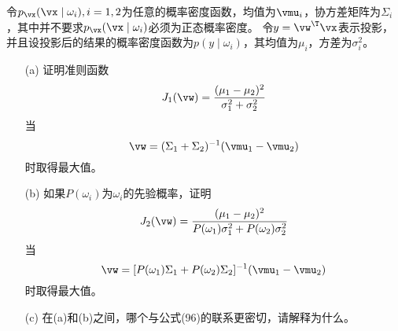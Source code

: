 \documentclass[reportComp]{thesis}
\begin{document}
\begin{question}[\textsection 3 Q38]
令$p_\vx(\vx\mid\omega_i),i=1,2$为任意的概率密度函数，均值为$\vmu_i$，协方差矩阵为$\Sigma_i$，其中并不要求$p_\vx(\vx\mid\omega_i)$必须为正态概率密度。
令$y=\vw^\T\vx$表示投影，并且设投影后的结果的概率密度函数为$p(y\mid\omega_i)$，其均值为$\mu_i$，方差为$\sigma^2_i$。
\begin{itemize}
	\item [(a)] 证明准则函数
	\[J_1(\vw)=\frac{(\mu_1-\mu_2)^2}{\sigma_1^2+\sigma_2^2}\]
	当
	\[\vw=(\Sigma_1+\Sigma_2)^{-1}(\vmu_1-\vmu_2)\]
	时取得最大值。
	\item [(b)] 如果$P(\omega_i)$为$\omega_i$的先验概率，证明
	\[J_2(\vw)=\frac{(\mu_1-\mu_2)^2}{P(\omega_1)\sigma_1^2+P(\omega_2)\sigma_2^2}\]
	当
	\[\vw=[P(\omega_1)\Sigma_1+P(\omega_2)\Sigma_2]^{-1}(\vmu_1-\vmu_2)\]
	时取得最大值。
	\item [(c)] 在(a)和(b)之间，哪个与公式(96)的联系更密切，请解释为什么。
\end{itemize}
\end{question}
\end{document}
